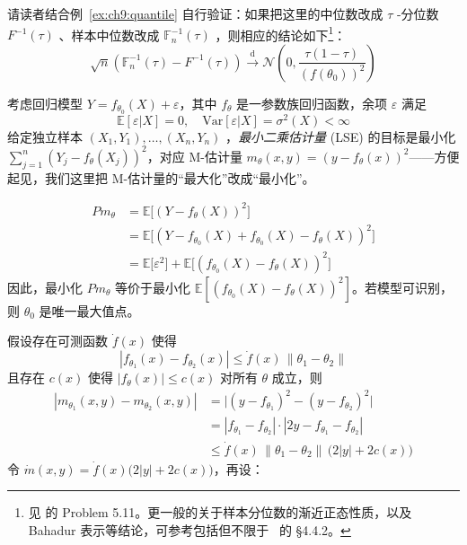 请读者结合例~\ref{ex:ch9:quantile} 自行验证：如果把这里的中位数改成 $\tau$ -分位数 $F^{-1}(\tau)$ 、样本中位数改成 $\mathbb F_n^{-1}(\tau)$ ，则相应的结论如下\footnote{见 \cite{vandervaart1998} 的 Problem 5.11。更一般的关于样本分位数的渐近正态性质，以及 Bahadur 表示等结论，可参考包括但不限于~\cite{chenxiru2009} 的 §4.4.2。}：
\[\sqrt{n}(\mathbb F_n^{-1}(\tau) - F^{-1}(\tau)) \overset{\mathrm{d}}{\to} \mathcal{N}\left(0, \frac{\tau(1-\tau)}{(f(\theta_0))^2}\right)\]


\begin{example}[非线性最小二乘]\label{ex:ch9:nonlinear-least-squares}
考虑回归模型 $Y = f_{\theta_0}(X) + \varepsilon$，其中 $f_\theta$ 是一参数族回归函数，余项 $\varepsilon$ 满足 \[ \mathbb{E}[\varepsilon|X]=0,\quad \mathrm{Var}[\varepsilon|X]=\sigma^2(X)<\infty \]给定独立样本 $(X_1,Y_1),\dots,(X_n,Y_n)$ ，\emph{最小二乘估计量} (LSE) 的目标是最小化 $\sum_{j=1}^n (Y_j - f_\theta(X_j))^2$，对应 M-估计量 $m_\theta(x,y) = (y-f_\theta(x))^2$------方便起见，我们这里把 M-估计量的``最大化''改成``最小化''。

\begin{equation}
\label{eq:ch9:tag-9}
\begin{aligned} P m_\theta &= \mathbb{E}\bigl[(Y-f_\theta(X))^2\bigr] \\ &= \mathbb{E}\bigl[(Y-f_{\theta_0}(X) + f_{\theta_0}(X)-f_\theta(X))^2\bigr] \\ &= \mathbb{E}\bigl[\varepsilon^2\bigr] + \mathbb{E}\bigl[(f_{\theta_0}(X)-f_\theta(X))^2\bigr] \end{aligned}
\end{equation}
因此，最小化 $P m_\theta$ 等价于最小化 $\mathbb{E}[(f_{\theta_0}(X)-f_\theta(X))^2]$。若模型可识别，则 $\theta_0$ 是唯一最大值点。

假设存在可测函数 $\dot{f}(x)$ 使得\[|f_{\theta_1}(x) - f_{\theta_2}(x)| \le \dot{f}(x)\,\|\theta_1-\theta_2\|\]
且存在 $c(x)$ 使得 $|f_\theta(x)|\le c(x)$ 对所有 $\theta$ 成立，则\[\begin{aligned} |m_{\theta_1}(x,y)-m_{\theta_2}(x,y)| &= \bigl|(y-f_{\theta_1})^2-(y-f_{\theta_2})^2\bigr| \\ &= |f_{\theta_1}-f_{\theta_2}| \cdot|2y-f_{\theta_1}-f_{\theta_2}| \\ &\le \dot{f}(x)\,\|\theta_1-\theta_2\|\,\bigl(2|y|+2c(x)\bigr) \end{aligned}\]
令 $\dot{m}(x,y) = \dot{f}(x)\bigl(2|y|+2c(x)\bigr)$，再设：


\end{example}
